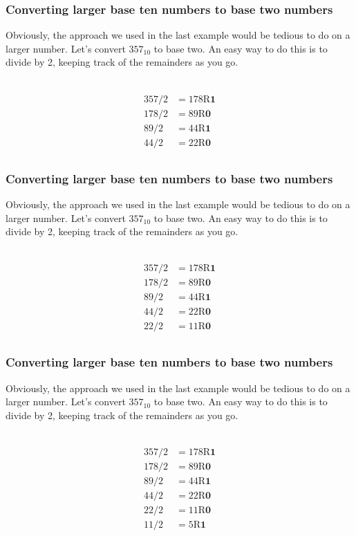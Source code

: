 \documentclass{if-beamer}
\begin{document}
\begin{frame}
\frametitle{Converting larger base ten numbers to base two numbers}

Obviously, the approach we used in the last example would be tedious to do on a larger number. Let's convert $357_{10}$ to base two. An easy way to do this is to divide by 2, keeping track of the remainders as you go. \\~\

\centering
\begin{align*}
357/2 &= 178 \textrm{R}\textbf{1} \\
178/2 &= 89 \textrm{R}\textbf{0}\\
89/2 &= 44 \textrm{R}\textbf{1}\\
44/2 &= 22 \textrm{R}\textbf{0}\\
\end{align*}
\end{frame}

\begin{frame}
\frametitle{Converting larger base ten numbers to base two numbers}

Obviously, the approach we used in the last example would be tedious to do on a larger number. Let's convert $357_{10}$ to base two. An easy way to do this is to divide by 2, keeping track of the remainders as you go. \\~\

\centering
\begin{align*}
357/2 &= 178 \textrm{R}\textbf{1} \\
178/2 &= 89 \textrm{R}\textbf{0}\\
89/2 &= 44 \textrm{R}\textbf{1}\\
44/2 &= 22 \textrm{R}\textbf{0}\\
22/2 &= 11 \textrm{R}\textbf{0}\\
\end{align*}
\end{frame}

\begin{frame}
\frametitle{Converting larger base ten numbers to base two numbers}

Obviously, the approach we used in the last example would be tedious to do on a larger number. Let's convert $357_{10}$ to base two. An easy way to do this is to divide by 2, keeping track of the remainders as you go. \\~\

\centering
\begin{align*}
357/2 &= 178 \textrm{R}\textbf{1} \\
178/2 &= 89 \textrm{R}\textbf{0}\\
89/2 &= 44 \textrm{R}\textbf{1}\\
44/2 &= 22 \textrm{R}\textbf{0}\\
22/2 &= 11 \textrm{R}\textbf{0}\\
11/2 &= 5 \textrm{R}\textbf{1}\\
\end{align*}
\end{frame}
\end{document}
